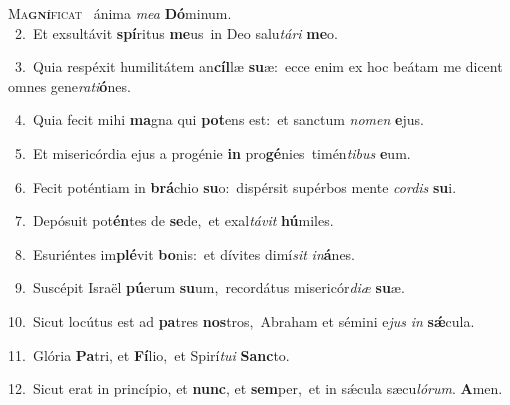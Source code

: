 \lettrine{\initial\textcolor{\initialcolor}{M}}{a\-\textbf{gní}\-ficat~\star} ánima \textit{me}\-\textit{a} \textbf{Dó}\-minum.\\
{\numbfont\textcolor{\numbcolor}{~2.}}~Et exsultávit \textbf{spí}\-ritus \textbf{me}\-us~\star in Deo salu\-\textit{tá}\-\textit{ri} \textbf{me}\-o.\par
{\numbfont\textcolor{\numbcolor}{~3.}}~Quia respéxit humilitátem an\-\textbf{cíl}\-læ \textbf{su}\-æ:~\star ecce enim ex hoc beátam me dicent omnes gene\-\textit{ra}\-\textit{ti}\textbf{ó}nes.\par
{\numbfont\textcolor{\numbcolor}{~4.}}~Quia fecit mihi \textbf{ma}\-gna qui \textbf{pot}\-ens est:~\star et sanctum \textit{no}\-\textit{men} \textbf{e}\-jus.\par
{\numbfont\textcolor{\numbcolor}{~5.}}~Et misericórdia ejus a progénie \textbf{in} pro\-\textbf{gé}\-nies~\star timén\-\textit{ti}\-\textit{bus} \textbf{e}\-um.\par
{\numbfont\textcolor{\numbcolor}{~6.}}~Fecit poténtiam in \textbf{brá}\-chio \textbf{su}\-o:~\star dispérsit supérbos mente \textit{cor}\-\textit{dis} \textbf{su}\-i.\par
{\numbfont\textcolor{\numbcolor}{~7.}}~Depósuit pot\-\textbf{én}\-tes de \textbf{se}\-de,~\star et exal\-\textit{tá}\-\textit{vit} \textbf{hú}\-miles.\par
{\numbfont\textcolor{\numbcolor}{~8.}}~Esuriéntes im\-\textbf{plé}\-vit \textbf{bo}\-nis:~\star et dívites dimí\textit{sit} \textit{in}\-\textbf{á}nes.\par
{\numbfont\textcolor{\numbcolor}{~9.}}~Suscépit Israël \textbf{pú}\-erum \textbf{su}\-um,~\star recordátus misericór\-\textit{di}\-\textit{æ} \textbf{su}\-æ.\par
{\numbfont\textcolor{\numbcolor}{10.}}~Sicut locútus est ad \textbf{pa}\-tres \textbf{nos}\-tros,~\star Abraham et sémini e\textit{jus} \textit{in} \textbf{sǽ}\-cula.\par
{\numbfont\textcolor{\numbcolor}{11.}}~Glória \textbf{Pa}\-tri, et \textbf{Fí}\-lio,~\star et Spirí\-\textit{tu}\-\textit{i} \textbf{Sanc}\-to.\par
{\numbfont\textcolor{\numbcolor}{12.}}~Sicut erat in princípio, et \textbf{nunc}\-, et \textbf{sem}\-per,~\star et in sǽcula sæcu\-\textit{ló}\-\textit{rum}. \textbf{A}\-men.\par
